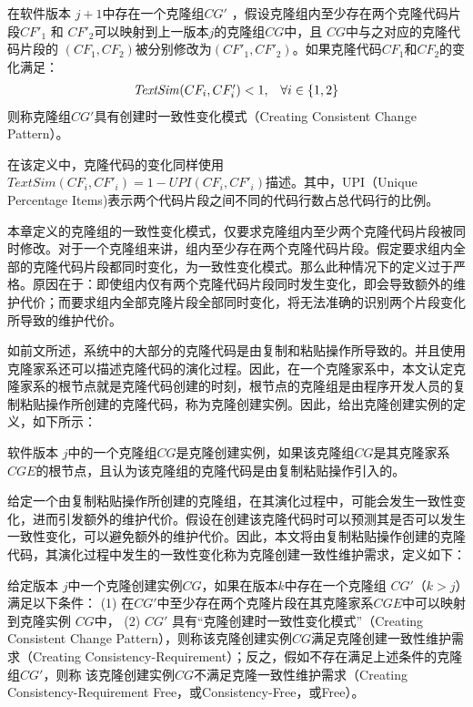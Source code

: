 \begin{definition}[克隆创建时一致性变化模式] 
\label{def-creatingpattern}
在软件版本 $j+1$中存在一个克隆组$CG'$ ，假设克隆组内至少存在两个克隆代码片段$CF'_1$ 和 $CF'_2$可以映射到上一版本$j$的克隆组$CG$中，且 $CG$中与之对应的克隆代码片段的 $(CF_1,CF_2)$被分别修改为$(CF'_1,CF'_2)$。如果克隆代码$CF_1$和$CF_2$的变化满足：
\begin{equation}
  \begin{array}[t]{cl}
    \mathit{TextSim}(CF_i, CF'_i) < 1, & \forall i \in \{1,2\}  \\
  \end{array}
\end{equation}
则称克隆组$CG'$具有创建时一致性变化模式（Creating Consistent Change Pattern）。
\end{definition}

在该定义中，克隆代码的变化同样使用$\mathit{TextSim}(CF_i, CF'_i)= 1 - \mathit{UPI}(CF_i, CF'_i)$描述。其中，UPI（Unique Percentage Items\cite{roy2008nicad})表示两个代码片段之间不同的代码行数占总代码行的比例。

本章定义的克隆组的一致性变化模式，仅要求克隆组内至少两个克隆代码片段被同时修改。对于一个克隆组来讲，组内至少存在两个克隆代码片段。假定要求组内全部的克隆代码片段都同时变化，为一致性变化模式。那么此种情况下的定义过于严格。原因在于：即使组内仅有两个克隆代码片段同时发生变化，即会导致额外的维护代价；而要求组内全部克隆片段全部同时变化，将无法准确的识别两个片段变化所导致的维护代价。

如前文所述，系统中的大部分的克隆代码是由复制和粘贴操作所导致的。并且使用克隆家系还可以描述克隆代码的演化过程。因此，在一个克隆家系中，本文认定克隆家系的根节点就是克隆代码创建的时刻，根节点的克隆组是由程序开发人员的复制粘贴操作所创建的克隆代码，称为克隆创建实例。因此，给出克隆创建实例的定义，如下所示：

\begin{definition}[克隆创建实例] 
\label{def-creatinginstance}
软件版本 $j$中的一个克隆组$CG$是克隆创建实例，如果该克隆组$CG$是其克隆家系$CGE$的根节点，且认为该克隆组的克隆代码是由复制粘贴操作引入的。
\end{definition}

给定一个由复制粘贴操作所创建的克隆组，在其演化过程中，可能会发生一致性变化，进而引发额外的维护代价。假设在创建该克隆代码时可以预测其是否可以发生一致性变化，可以避免额外的维护代价。因此，本文将由复制粘贴操作创建的克隆代码，其演化过程中发生的一致性变化称为克隆创建一致性维护需求，定义如下：

\begin{definition}[克隆创建时一致性维护需求] 
 \label{def-creatingrequirement}
给定版本 $j$中一个克隆创建实例$CG$，如果在版本$k$中存在一个克隆组 $CG'$（$k>j$）满足以下条件： (1) 在$CG'$中至少存在两个克隆片段在其克隆家系$CGE$中可以映射到克隆实例 $CG$中， (2) $CG'$ 具有“克隆创建时一致性变化模式”（Creating Consistent Change Pattern），则称该克隆创建实例$CG$满足克隆创建一致性维护需求（Creating Consistency-Requirement）；反之，假如不存在满足上述条件的克隆组$CG'$，则称 该克隆创建实例$CG$不满足克隆一致性维护需求（Creating Consistency-Requirement Free，或Consistency-Free，或Free）。
\end{definition}

